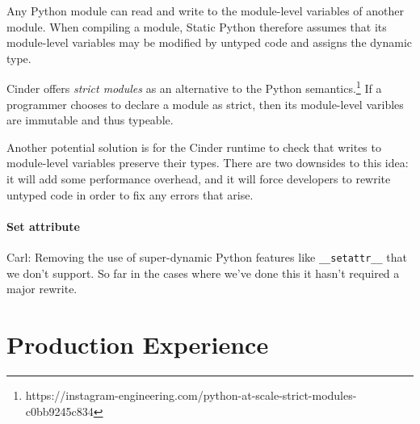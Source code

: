 \documentclass[english,cleveref,submission]{programming}
\newcommand{\SP}{Static Python}
\newcommand{\code}[1]{\texttt{#1}}
\begin{document}
Any Python module can read and write to the module-level variables of another module.
When compiling a module, \SP{} therefore assumes that its module-level variables
may be modified by untyped code and assigns the dynamic type.

Cinder offers \emph{strict modules} as an alternative to the Python
semantics.\footnote{https://instagram-engineering.com/python-at-scale-strict-modules-c0bb9245c834}
If a programmer chooses to declare a module as strict, then its module-level varibles
are immutable and thus typeable.

Another potential solution is for the Cinder runtime to check that writes to module-level variables
preserve their types.
There are two downsides to this idea:
it will add some performance overhead,
and it will force developers to rewrite untyped code in order to fix any errors that arise.


\paragraph{Set attribute}

Carl: Removing the use of super-dynamic Python features like
\code{\_\_setattr\_\_} that we don’t support. So far in the cases where
we’ve done this it hasn’t required a major rewrite.


\section{Production Experience}
\label{s:eval}




\end{document}
